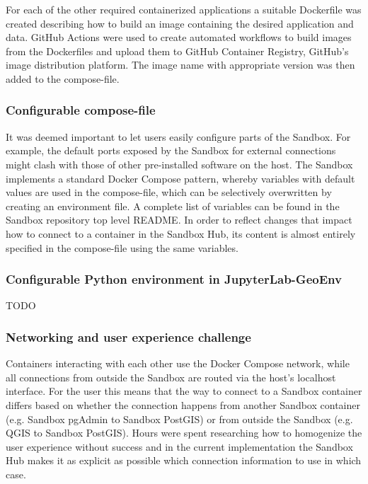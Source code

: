 \documentclass[11pt, a4paper, oneside, parskip=full-]{scrartcl}
\begin{document}
For each of the other required containerized applications a suitable Dockerfile
was created describing how to build an image containing the desired application
and data. GitHub Actions\cite{githubactions} were used to create automated
workflows to build images from the Dockerfiles and upload them to GitHub
Container Registry\cite{gcr}, GitHub's image distribution platform. The image
name with appropriate version was then added to the compose-file.

\subsubsection*{Configurable compose-file}
It was deemed important to let users easily configure parts of the Sandbox. For
example, the default ports exposed by the Sandbox for external connections might
clash with those of other pre-installed software on the host. The Sandbox
implements a standard Docker Compose pattern, whereby variables with default
values are used in the compose-file, which can be selectively overwritten by
creating an environment file\cite{composeenvfile}. A complete list of variables
can be found in the Sandbox repository top level README\cite{osgeostacksandbox}.
In order to reflect changes that impact how to connect to a container in the
Sandbox Hub, its content is almost entirely specified in the compose-file using
the same variables.

\subsubsection*{Configurable Python environment in JupyterLab-GeoEnv}
TODO

\subsubsection*{Networking and user experience challenge}
Containers interacting with each other use the Docker Compose network, while all
connections from outside the Sandbox are routed via the host's localhost
interface. For the user this means that the way to connect to a Sandbox
container differs based on whether the connection happens from another Sandbox
container (e.g. Sandbox pgAdmin to Sandbox PostGIS) or from outside the Sandbox
(e.g. QGIS to Sandbox PostGIS). Hours were spent researching how to homogenize
the user experience without success and in the current implementation the
Sandbox Hub makes it as explicit as possible which connection information to use
in which case.
\end{document}
